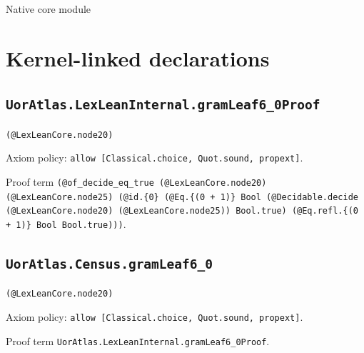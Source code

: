 \documentclass[11pt]{article}
\begin{document}
\begin{center}{\LARGE Native core module}\end{center}
\section*{Kernel-linked declarations}
\subsection*{\texttt{UorAtlas.LexLeanInternal.gramLeaf6\_0Proof}}
\noindent\texttt{(@LexLeanCore.node20)}\par
\noindent Axiom policy: \texttt{allow [Classical.choice, Quot.sound, propext]}.\par
\noindent Proof term \texttt{(@of\_decide\_eq\_true (@LexLeanCore.node20) (@LexLeanCore.node25) (@id.\{0\} (@Eq.\{(0 + 1)\} Bool (@Decidable.decide (@LexLeanCore.node20) (@LexLeanCore.node25)) Bool.true) (@Eq.refl.\{(0 + 1)\} Bool Bool.true)))}.\par
\subsection*{\texttt{UorAtlas.Census.gramLeaf6\_0}}
\noindent\texttt{(@LexLeanCore.node20)}\par
\noindent Axiom policy: \texttt{allow [Classical.choice, Quot.sound, propext]}.\par
\noindent Proof term \texttt{UorAtlas.LexLeanInternal.gramLeaf6\_0Proof}.\par
\end{document}
